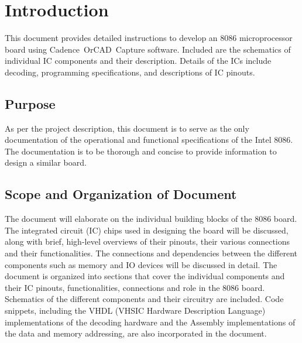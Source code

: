 \newpage
\section{Introduction}
This document provides detailed instructions to develop an 8086 microprocessor board using Cadence\textregistered \ OrCAD\textregistered \ Capture software. Included are the schematics of individual IC components and their description. Details of the ICs include decoding, programming specifications, and descriptions of IC pinouts.

    \subsection{Purpose}
    As per the project description, this document is to serve as the only documentation of the operational and functional specifications of the Intel 8086. The documentation is to be thorough and concise to provide information to design a similar board.

    \subsection{Scope and Organization of Document}
    The document will elaborate on the individual building blocks of the 8086 board. The integrated circuit (IC) chips used in designing the board will be discussed, along with brief, high-level overviews of their pinouts, their various connections and their functionalities. The connections and dependencies between the different components such as memory and IO devices will be discussed in detail.\n
    The document is organized into sections that cover the individual components and their IC pinouts, functionalities, connections and role in the 8086 board. Schematics of the different components and their circuitry are included. Code snippets, including the VHDL (VHSIC Hardware Description Language) implementations of the decoding hardware and the Assembly implementations of the data and memory addressing, are also incorporated in the document.
